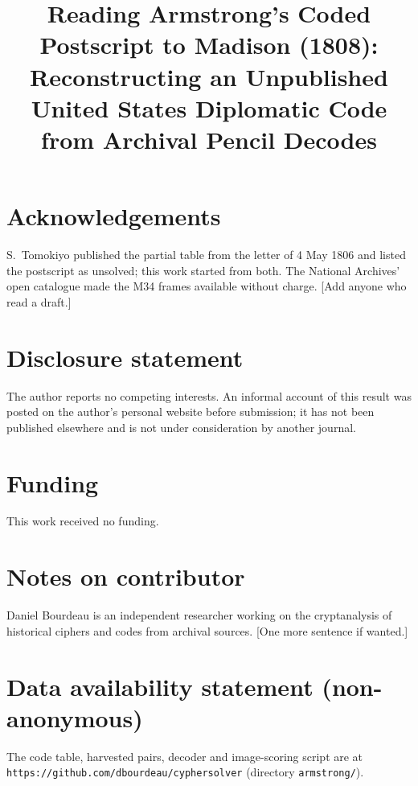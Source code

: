 \documentclass[]{interact}
\begin{document}
\title{Reading Armstrong's Coded Postscript to Madison (1808): Reconstructing an Unpublished United States Diplomatic Code from Archival Pencil Decodes}

\author{
}

\maketitle

\section*{Acknowledgements}

S.~Tomokiyo published the partial table from the letter of 4 May 1806 and listed the postscript as unsolved; this work started from both. The National Archives' open catalogue made the M34 frames available without charge. [Add anyone who read a draft.]

\section*{Disclosure statement}

The author reports no competing interests. An informal account of this result was posted on the author's personal website before submission; it has not been published elsewhere and is not under consideration by another journal.

\section*{Funding}

This work received no funding.

\section*{Notes on contributor}

Daniel Bourdeau is an independent researcher working on the cryptanalysis of historical ciphers and codes from archival sources. [One more sentence if wanted.]

\section*{Data availability statement (non-anonymous)}

The code table, harvested pairs, decoder and image-scoring script are at \texttt{https://github.com/dbourdeau/cyphersolver} (directory \texttt{armstrong/}).
\end{document}

